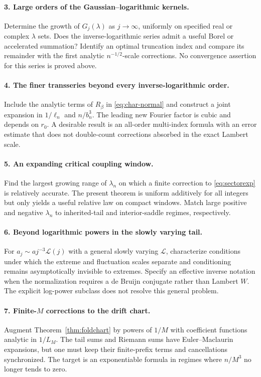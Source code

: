 \documentclass[11pt,a4paper]{article}
\numberwithin{equation}{section}
\theoremstyle{definition}
\theoremstyle{remark}
\begin{document}
\paragraph{3. Large orders of the Gaussian--logarithmic kernels.}
Determine the growth of $G_j(\lambda)$ as $j\to\infty$, uniformly on
specified real or complex $\lambda$ sets. Does the inverse-logarithmic
series admit a useful Borel or accelerated summation? Identify an
optimal truncation index and compare its remainder with the first
analytic $n^{-1/2}$-scale corrections. No convergence assertion for
this series is proved above.

\paragraph{4. The finer transseries beyond every inverse-logarithmic order.}
Include the analytic terms of $R_\beta$ in \eqref{eq:char-normal} and
construct a joint expansion in $1/\ell_n$ and $n/b_n^3$. The leading
new Fourier factor is cubic and depends on $r_0$. A desirable result
is an all-order multi-index formula with an error estimate that does
not double-count corrections absorbed in the exact Lambert scale.

\paragraph{5. An expanding critical coupling window.}
Find the largest growing range of $\lambda_n$ on which a finite
correction to \eqref{eq:sectorexp} is relatively accurate. The present
theorem is uniform additively for all integers but only yields a useful
relative law on compact windows. Match large positive and negative
$\lambda_n$ to inherited-tail and interior-saddle regimes, respectively.

\paragraph{6. Beyond logarithmic powers in the slowly varying tail.}
For $a_j\sim a j^{-3}\mathcal L(j)$ with a general slowly varying
$\mathcal L$, characterize conditions under which the extreme and
fluctuation scales separate and conditioning remains asymptotically
invisible to extremes. Specify an effective inverse notation when the
normalization requires a de Bruijn conjugate rather than Lambert $W$.
The explicit log-power subclass does not resolve this general problem.

\paragraph{7. Finite-$M$ corrections to the drift chart.}
Augment Theorem~\ref{thm:foldchart} by powers of $1/M$ with coefficient
functions analytic in $1/L_M$. The tail sums and Riemann sums have
Euler--Maclaurin expansions, but one must keep their finite-prefix
terms and cancellations synchronized. The target is an exponentiable
formula in regimes where $n/M^3$ no longer tends to zero.
\end{document}
